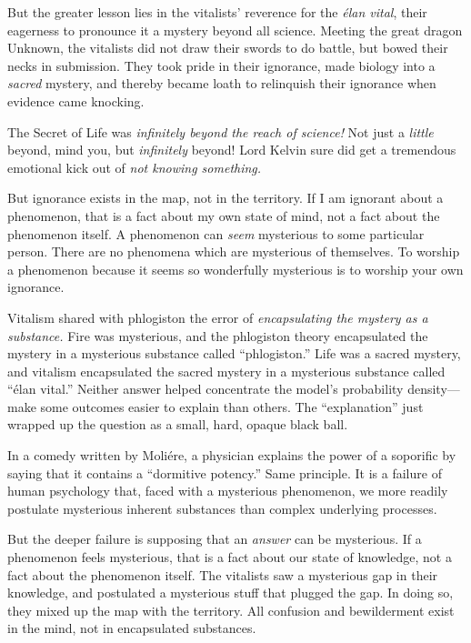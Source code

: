 {
 But the greater lesson lies in the vitalists'
reverence for the \textit{élan vital}, their eagerness to pronounce it
a mystery beyond all science. Meeting the great dragon Unknown, the
vitalists did not draw their swords to do battle, but bowed their necks
in submission. They took pride in their ignorance, made biology into a
\textit{sacred} mystery, and thereby became loath to relinquish their
ignorance when evidence came knocking.}

{
 The Secret of Life was \textit{infinitely beyond the reach of
science!} Not just a \textit{little} beyond, mind you, but
\textit{infinitely} beyond! Lord Kelvin sure did get a tremendous
emotional kick out of \textit{not knowing something.}}

{
 But ignorance exists in the map, not in the territory. If I am
ignorant about a phenomenon, that is a fact about my own state of mind,
not a fact about the phenomenon itself. A phenomenon can \textit{seem}
mysterious to some particular person. There are no phenomena which are
mysterious of themselves. To worship a phenomenon because it seems so
wonderfully mysterious is to worship your own ignorance.}

{
 Vitalism shared with phlogiston the error of \textit{encapsulating
the mystery as a substance.} Fire was mysterious, and the phlogiston
theory encapsulated the mystery in a mysterious substance called
``phlogiston.'' Life was a sacred
mystery, and vitalism encapsulated the sacred mystery in a mysterious
substance called ``élan vital.''
Neither answer helped concentrate the model's
probability density---make some outcomes easier to explain than others.
The ``explanation'' just wrapped up
the question as a small, hard, opaque black ball.}

{
 In a comedy written by Moliére, a physician explains the power of
a soporific by saying that it contains a ``dormitive
potency.'' Same principle. It is a failure of human
psychology that, faced with a mysterious phenomenon, we more readily
postulate mysterious inherent substances than complex underlying
processes.}

{
 But the deeper failure is supposing that an \textit{answer} can be
mysterious. If a phenomenon feels mysterious, that is a fact about our
state of knowledge, not a fact about the phenomenon itself. The
vitalists saw a mysterious gap in their knowledge, and postulated a
mysterious stuff that plugged the gap. In doing so, they mixed up the
map with the territory. All confusion and bewilderment exist in the
mind, not in encapsulated substances.}

